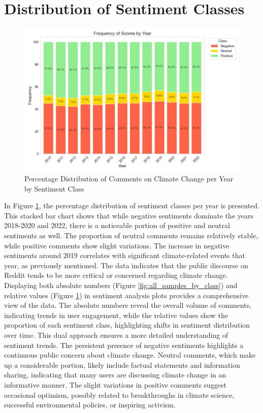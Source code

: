 \section{Distribution of Sentiment Classes}
\begin{figure}[h!]
    \includegraphics[width=\textwidth]{images/overview/samples_all_by_class_stacked.png}
    \caption{Percentage Distribution of Comments on Climate Change per Year by Sentiment Class}
    \label{fig:all_samples_by_class_percentage}
\end{figure}
In Figure \ref{fig:all_samples_by_class_percentage}, the percentage distribution of sentiment classes per year is presented. This stacked bar chart shows that while negative sentiments dominate the years 2018-2020 and 2022, there is a noticeable portion of positive and neutral sentiments as well. The proportion of neutral comments remains relatively stable, while positive comments show slight variations. The increase in negative sentiments around 2019 correlates with significant climate-related events that year, as previously mentioned. The data indicates that the public discourse on Reddit tends to be more critical or concerned regarding climate change.
Displaying both absolute numbers (Figure \ref{fig:all_samples_by_class}) and relative values (Figure \ref{fig:all_samples_by_class_percentage}) in sentiment analysis plots provides a comprehensive view of the data. The absolute numbers reveal the overall volume of comments, indicating trends in user engagement, while the relative values show the proportion of each sentiment class, highlighting shifts in sentiment distribution over time. This dual approach ensures a more detailed understanding of sentiment trends.
The persistent presence of negative sentiments highlights a continuous public concern about climate change. Neutral comments, which make up a considerable portion, likely include factual statements and information sharing, indicating that many users are discussing climate change in an informative manner. The slight variations in positive comments suggest occasional optimism, possibly related to breakthroughs in climate science, successful environmental policies, or inspiring activism.


